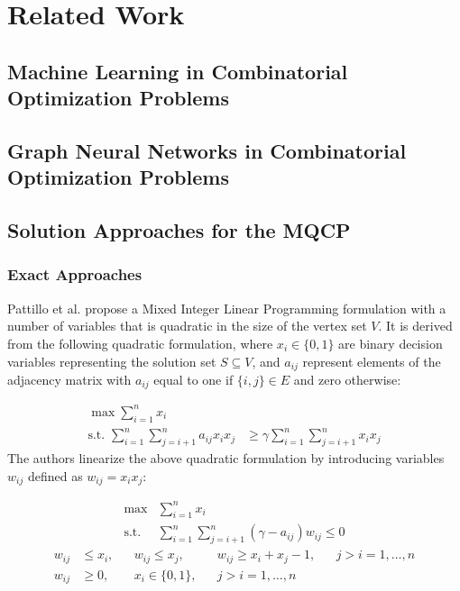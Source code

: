 \documentclass[draft,final]{vutinfth} %
\begin{document}
\chapter{Related Work}

\section{Machine Learning in Combinatorial Optimization Problems}

\section{Graph Neural Networks in Combinatorial Optimization Problems}

\section{Solution Approaches for the MQCP}
\subsection{Exact Approaches}\label{milp-mqcp}
Pattillo et al. \cite{pattillo_maximum_2013} propose a Mixed Integer Linear Programming formulation with a number of variables that is quadratic in the size of the vertex set $V$. 
It is derived from the following quadratic formulation, where $x_i \in \{0,1\}$ are binary decision variables representing the solution set $S \subseteq V$, and $a_{ij}$ represent elements of the adjacency matrix with $a_{ij}$ equal to one if $\{i,j\} \in E$ and zero otherwise: 

\begin{align}
    \max \sum_{i=1}^{n} x_i & \\
    \text{s.t. } \sum_{i=1}^n \sum_{j=i+1}^n a_{ij} x_i x_j & \geq \gamma \sum_{i=1}^n \sum_{j=i+1}^n x_i x_j
\end{align}
The authors linearize the above quadratic formulation by introducing variables $w_{ij}$ defined as $w_{ij} = x_i x_j$: 

\begin{align}
    \max & \sum_{i=1}^n x_i \\
    \text{s.t. } & \sum_{i=1}^n \sum_{j=i+1}^n (\gamma - a_{ij}) w_{ij} \leq 0  
\end{align}
\begin{align}
    w_{ij} &\leq x_i, & & w_{ij} \leq x_j, & & w_{ij} \geq x_i + x_j - 1, & & j > i=1, \dots , n \\
    w_{ij} &\geq 0,   & & x_i \in \{0,1\}, & & j > i = 1, \dots, n        & & 
\end{align}
\end{document}
